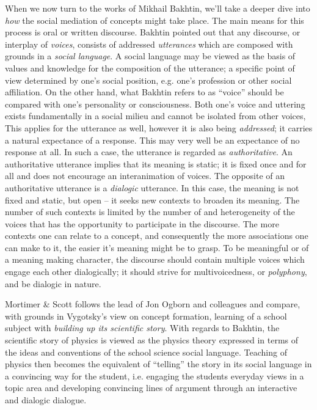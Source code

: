\documentclass[aps,prb,floatfix,twocolumn,twoside,english]{revtex4-1}
\begin{document}
When we now turn to the works of Mikhail Bakhtin, we'll take a deeper dive into \textit{how} the social mediation of concepts might take place. The main means for this process is oral or written discourse. Bakhtin pointed out that any discourse, or interplay of \textit{voices}, consists of addressed \textit{utterances} which are composed with grounds in a \textit{social language}.\cite{Wertsch:1991} A social language may be viewed as the basis of values and knowledge for the composition of the utterance; a specific point of view determined by one's social position, e.g. one's profession or other social affiliation. On the other hand, what Bakhtin refers to as ``voice'' should be compared with one's personality or consciousness. Both one's voice and uttering exists fundamentally in a social milieu and cannot be isolated from other voices, This applies for the utterance as well, however it is also being \textit{addressed}; it carries a natural expectance of a response. This may very well be an expectance of no response at all. In such a case, the utterance is regarded as \textit{authoritative}. An authoritative utterance implies that its meaning is static; it is fixed once and for all and does not encourage an interanimation of voices. The opposite of an authoritative utterance is a \textit{dialogic} utterance. In this case, the meaning is not fixed and static, but open -- it seeks new contexts to broaden its meaning. The number of such contexts is limited by the number of and heterogeneity of the voices that has the opportunity to participate in the discourse. The more contexts one can relate to a concept, and consequently the more associations one can make to it, the easier it's meaning might be to grasp.\cite{Kubli:2005} To be meaningful or of a meaning making character, the discourse should contain multiple voices which engage each other dialogically; it should strive for multivoicedness, or \textit{polyphony}, and be dialogic in nature.

Mortimer \& Scott follows the lead of Jon Ogborn and colleagues and compare, with grounds in Vygotsky's view on concept formation, learning of a school subject with \textit{building up its scientific story}.\cite{Mortimer:2003,Ogborn:1996} With regards to Bakhtin, the scientific story of physics is viewed as the physics theory expressed in terms of the ideas and conventions of the school science social language. Teaching of physics then becomes the equivalent of ``telling'' the story in its social language in a convincing way for the student, i.e. engaging the students everyday views in a topic area and developing convincing lines of argument through an interactive and dialogic dialogue.
\end{document}
